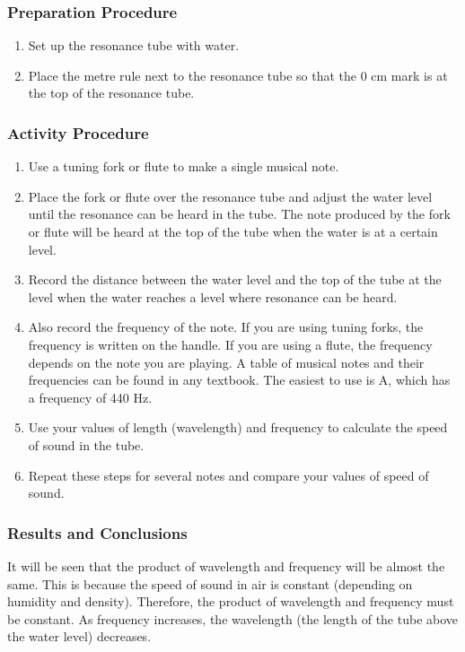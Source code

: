 \subsubsection*{Preparation Procedure}
\begin{enumerate}
\item{Set up the resonance tube with water.} 
\item{Place the metre rule next to the resonance tube so that the 0 cm mark is at the top of the resonance tube.} 
\end{enumerate}

\subsubsection*{Activity Procedure}
\begin{enumerate}
\item{Use a tuning fork or flute to make a single musical note.} 
\item{Place the fork or flute over the resonance tube and adjust the water level until the resonance can be heard in the tube. The note produced by the fork or flute will be heard at the top of the tube when the water is at a certain level.} 
\item{Record the distance between the water level and the top of the tube at the level when the water reaches a level where resonance can be heard.} 
\item{Also record the frequency of the note. If you are using tuning forks, the frequency is written on the handle. If you are using a flute, the frequency depends on the note you are playing. A table of musical notes and their frequencies can be found in any textbook. The easiest to use is A, which has a frequency of 440 Hz.} 
\item{Use your values of length (wavelength) and frequency to calculate the speed of sound in the tube.} 
\item{Repeat these steps for several notes and compare your values of speed of sound.} 
\end{enumerate}

\subsubsection*{Results and Conclusions}
It will be seen that the product of wavelength and frequency will be almost the same. This is because the speed of sound in air is constant (depending on humidity and density). Therefore, the product of wavelength and frequency must be constant. As frequency increases, the wavelength (the length of the tube above the water level) decreases.  

